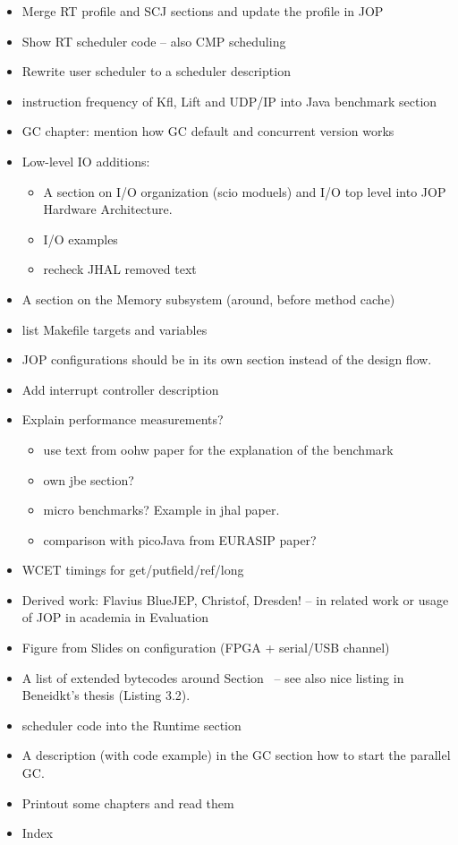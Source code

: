 \begin{itemize}
  \item Merge RT profile and SCJ sections and update the profile
      in JOP
  \item Show RT scheduler code -- also CMP scheduling
  \item Rewrite user scheduler to a scheduler description
    \item instruction frequency of Kfl, Lift and UDP/IP into Java
        benchmark section
    \item GC chapter: mention how GC default and concurrent
        version works
    \item Low-level IO additions:
    \begin{itemize}
      \item A section on I/O organization (scio moduels) and
          I/O top level into JOP Hardware Architecture.
      \item I/O examples
      \item recheck JHAL removed text
    \end{itemize}
    \item A section on the Memory subsystem (around, before
        method cache)
  \item list Makefile targets and variables
  \item JOP configurations should be in its own section instead
      of the design flow.
    \item Add interrupt controller description
    \item Explain performance measurements?
    \begin{itemize}
        \item use text from oohw paper for the explanation of
            the benchmark
        \item own jbe section?
        \item micro benchmarks? Example in jhal paper.
        \item comparison with picoJava from EURASIP paper?
    \end{itemize}
  \item WCET timings for get/putfield/ref/long
    \item Derived work: Flavius BlueJEP, Christof, Dresden! -- in
        related work or usage of JOP in academia in Evaluation
    \item Figure from Slides on configuration (FPGA + serial/USB
        channel)
    \item A list of extended bytecodes around
        Section~\label{subsec:flex:bc} -- see also nice listing
        in Beneidkt's thesis (Listing 3.2).
    \item scheduler code into the Runtime section
    \item A description (with code example) in the GC section how
        to start the parallel GC.
    \item Printout some chapters and read them
    \item Index
\end{itemize}

